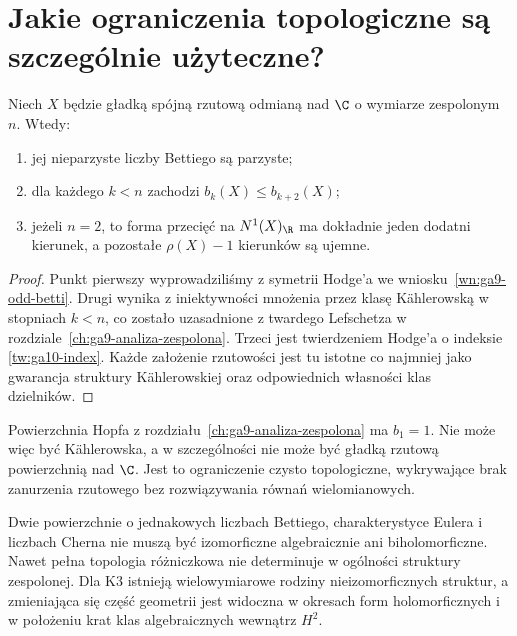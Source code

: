 \section{Jakie ograniczenia topologiczne są szczególnie użyteczne?}
\label{sec:ga10-konsekwencje}

\begin{stwierdzenie}
Niech $X$ będzie gładką spójną rzutową odmianą nad $\C$
o wymiarze zespolonym $n$. Wtedy:
\begin{enumerate}[label=\arabic*)]
\item jej nieparzyste liczby Bettiego są parzyste;
\item dla każdego $k<n$ zachodzi $b_k(X)\le b_{k+2}(X)$;
\item jeżeli $n=2$, to forma przecięć na $N^1(X)_{\R}$
ma dokładnie jeden dodatni kierunek, a pozostałe
$\rho(X)-1$ kierunków są ujemne.
\end{enumerate}
\end{stwierdzenie}
\begin{proof}
Punkt pierwszy wyprowadziliśmy z symetrii Hodge'a
we wniosku~\ref{wn:ga9-odd-betti}. Drugi wynika z
iniektywności mnożenia przez klasę Kählerowską
w stopniach $k<n$, co zostało uzasadnione z twardego
Lefschetza w rozdziale~\ref{ch:ga9-analiza-zespolona}.
Trzeci jest twierdzeniem Hodge'a o indeksie
\ref{tw:ga10-index}. Każde założenie rzutowości
jest tu istotne co najmniej jako gwarancja struktury
Kählerowskiej oraz odpowiednich własności klas dzielników.
\end{proof}

\begin{przyklad}
Powierzchnia Hopfa z rozdziału~\ref{ch:ga9-analiza-zespolona}
ma $b_1=1$. Nie może więc być Kählerowska,
a w szczególności nie może być gładką rzutową
powierzchnią nad $\C$. Jest to ograniczenie
czysto topologiczne, wykrywające brak zanurzenia
rzutowego bez rozwiązywania równań wielomianowych.
\end{przyklad}

\begin{uwaga}
Dwie powierzchnie o jednakowych liczbach Bettiego,
charakterystyce Eulera i liczbach Cherna nie muszą być
izomorficzne algebraicznie ani biholomorficzne.
Nawet pełna topologia różniczkowa nie determinuje
w ogólności struktury zespolonej. Dla K3 istnieją
wielowymiarowe rodziny nieizomorficznych struktur,
a zmieniająca się część geometrii jest widoczna
w okresach form holomorficznych i w położeniu krat
klas algebraicznych wewnątrz $H^2$.
\end{uwaga}

